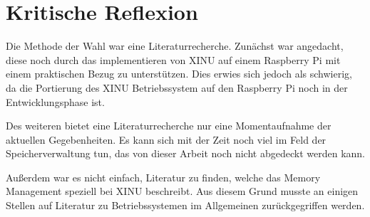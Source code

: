 \section{Kritische Reflexion}
\label{sec:Kritik}
Die Methode der Wahl war eine Literaturrecherche. Zunächst war angedacht, diese noch durch das implementieren von XINU auf einem Raspberry Pi mit einem praktischen Bezug zu unterstützen. Dies erwies sich jedoch als schwierig, da die Portierung des XINU Betriebssystem auf den Raspberry Pi noch in der Entwicklungsphase ist.

Des weiteren bietet eine Literaturrecherche nur eine Momentaufnahme der aktuellen Gegebenheiten. Es kann sich mit der Zeit noch viel im Feld der Speicherverwaltung tun, das von dieser Arbeit noch nicht abgedeckt werden kann.

Außerdem war es nicht einfach, Literatur zu finden, welche das Memory Management speziell bei XINU beschreibt. Aus diesem Grund musste an einigen Stellen auf Literatur zu Betriebssystemen im Allgemeinen zurückgegriffen werden.
